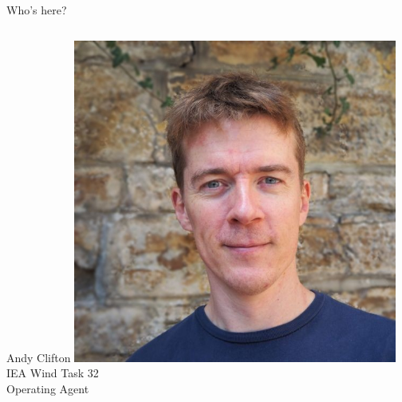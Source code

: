 
\begin{frame}{Who's here?}
    
    \begin{columns}[t]
        \begin{column}{.3\textwidth}
    
            \begin{block}{Andy Clifton}
            \centering
            \includegraphics[width=0.8\textwidth]{images/Clifton_Headshot.jpg}\\
            IEA Wind Task 32\\ Operating Agent \\
            \end{block}
        \end{column}
   

\end{columns}
\end{frame}

